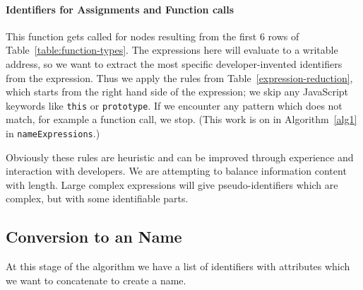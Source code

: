 \documentclass[10pt, preprint]{sigplanconf}
\begin{document}
{\paragraph{Identifiers for Assignments and Function calls} This function gets called for nodes resulting from the first 6 rows of Table~\ref{table:function-types}. The expressions here will evaluate to a writable address, so we want to extract the most specific developer-invented identifiers from the expression. Thus we apply the rules from Table~\ref{expression-reduction}, which starts from the right hand side of the expression;  we skip any JavaScript keywords like \texttt{this} or \texttt{prototype}. If we encounter any pattern which does not match, for example a function call, we stop.   (This work is on in Algorithm~\ref{alg1} in \verb|nameExpressions|.)

Obviously these rules are heuristic and can be improved through experience and interaction with developers. We are attempting to balance information content with length. Large complex expressions will give pseudo-identifiers which are complex, but with some identifiable parts.

\begin{table}
\centering
{}
\caption{JavaScript Expression Reduction to a Name. Expressions which match an entry in the pattern column are converted as shown in the Name column. Here \texttt{e} indicates an expression, \texttt{id} indicates an identifier, \texttt{+} means string concatenation and \texttt{Name()} means we apply the pattern matching recursively.}
\label{expression-reduction} 
\end{table}    

\subsection{Conversion to an Name}
\label{sec:concatenation}
At this stage of the algorithm we have a list of identifiers with attributes which we want to concatenate to create a name. 

}
\end{document}
